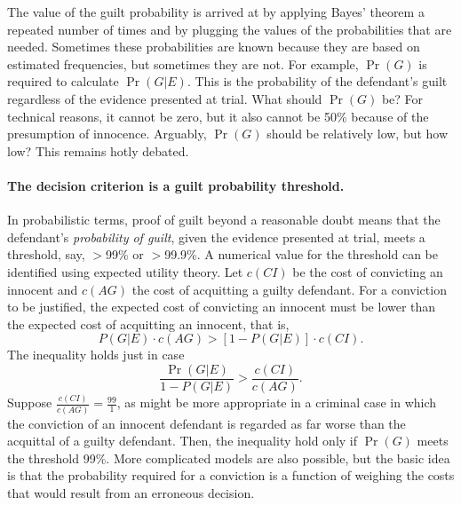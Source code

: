 \documentclass[10pt]{article}
\begin{document}
The value of the guilt probability is arrived at by applying Bayes' theorem a 
repeated number of times and by plugging the values of the probabilities that are needed. 
Sometimes these probabilities are known because they are based on estimated frequencies, but sometimes 
they are not. For example, $\Pr(G)$ is required to calculate $\Pr(G|E)$. 
This is the probability of the defendant's guilt regardless of the evidence 
presented at trial. What should $\Pr(G)$ be?
For technical reasons, it cannot be zero, but it also cannot be 50\% because 
of the presumption of innocence. Arguably, $\Pr(G)$ should be relatively low, but how low?
This remains hotly debated. 


\paragraph{The decision criterion is a guilt probability threshold.}

In probabilistic terms, proof of guilt beyond a reasonable doubt means 
that the defendant's \textit{probability of guilt}, given the evidence presented at trial, meets a 
threshold, say, $>$99\% or $>$99.9\%. 
%
A numerical value for the threshold can be identified using expected utility theory. 
Let $c(CI)$ be the cost of convicting an innocent and $c(AG)$ the cost 
of acquitting a guilty defendant. For a conviction to be justified, the 
expected cost of convicting an innocent must be lower than the expected 
cost of acquitting an innocent, that is, 
%
\[ P(G|E) \cdot c(AG) > [1-P(G|E)] \cdot c(CI) .\]
%
The inequality holds just in case 
%
\[ \frac{\Pr(G|E)}{1- P(G|E)} > \frac{c(CI)}{c(AG)}.\]
%
Suppose $ \frac{c(CI)}{c(AG)}=\frac{99}{1}$, as might be more appropriate in a criminal 
case in which the conviction of an innocent defendant is regarded as far worse than the acquittal of a guilty defendant.
Then, the inequality hold only if $\Pr(G)$ meets the threshold 99\%.
More complicated models are also possible, but the basic idea is that the probability 
required for a conviction is a function of weighing the 
costs that would result from an erroneous decision. 
\end{document}
